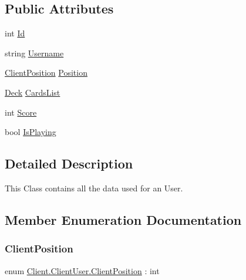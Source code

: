 \subsection*{Public Attributes}
\begin{DoxyCompactItemize}
\item 
int \hyperlink{class_client_1_1_client_user_ad2b381bf17a07b968f424b871c8cd282}{Id}
\item 
string \hyperlink{class_client_1_1_client_user_a6d7e902f2d43717e5a1bf49ff584f1ba}{Username}
\item 
\hyperlink{class_client_1_1_client_user_a346cb93cba9cd67a4de7410a02828cc7}{Client\+Position} \hyperlink{class_client_1_1_client_user_aed7f2c9aec11669fd21ea87e3968d8f0}{Position}
\item 
\hyperlink{class_game_1_1_deck}{Deck} \hyperlink{class_client_1_1_client_user_ab274adea6fea7e9b7f637c2d1e0592e7}{Cards\+List}
\item 
int \hyperlink{class_client_1_1_client_user_a116f16f187c387955d724291aa44c5eb}{Score}
\item 
bool \hyperlink{class_client_1_1_client_user_a77ae6af8f7fb3c66ddd5b3013b55c2aa}{Is\+Playing}
\end{DoxyCompactItemize}


\subsection{Detailed Description}
This Class contains all the data used for an User. 

\subsection{Member Enumeration Documentation}
\mbox{\label{class_client_1_1_client_user_a346cb93cba9cd67a4de7410a02828cc7}} 
\subsubsection{\texorpdfstring{Client\+Position}{ClientPosition}}
{\footnotesize\ttfamily enum \hyperlink{class_client_1_1_client_user_a346cb93cba9cd67a4de7410a02828cc7}{Client.\+Client\+User.\+Client\+Position} \+: int\hspace{0.3cm}{\ttfamily [strong]}}

